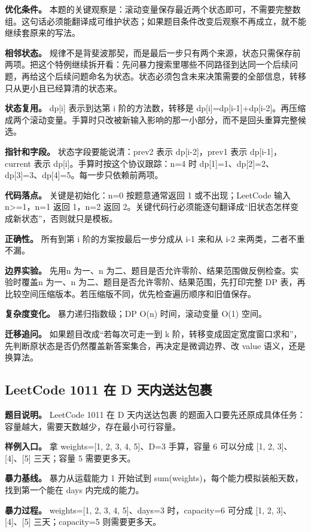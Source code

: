\textbf{优化条件。} 本题的关键观察是：滚动变量保存最近两个状态即可，不需要完整数组。这句话必须能翻译成可维护状态；如果题目条件改变后观察不再成立，就不能继续套原来的写法。

\textbf{相邻状态。} 规律不是背斐波那契，而是最后一步只有两个来源，状态只需保存前两项。把这个特例继续拆开看：先问暴力搜索里哪些不同路径到达同一个后续问题，再给这个后续问题命名为状态。状态必须包含未来决策需要的全部信息，转移只从更小且已经算清的状态来。

\textbf{状态复用。} dp[i] 表示到达第 i 阶的方法数，转移是 dp[i]=dp[i-1]+dp[i-2]。再压缩成两个滚动变量。手算时只改被新输入影响的那一小部分，而不是回头重算完整候选。

\textbf{指针和字段。} 状态字段要能说清：prev2 表示 dp[i-2]，prev1 表示 dp[i-1]，current 表示 dp[i]。手算时按这个协议跟踪：n=4 时 dp[1]=1、dp[2]=2、dp[3]=3、dp[4]=5。每一步只依赖前两项。

\textbf{代码落点。} 关键是初始化：n=0 按题意通常返回 1 或不出现；LeetCode 输入 n>=1，n=1 返回 1，n=2 返回 2。关键代码行必须能逐句翻译成“旧状态怎样变成新状态”，否则就只是模板。

\textbf{正确性。} 所有到第 i 阶的方案按最后一步分成从 i-1 来和从 i-2 来两类，二者不重不漏。

\textbf{边界实验。} 先用n 为一、n 为二、题目是否允许零阶、结果范围做反例检查。实验时覆盖n 为一、n 为二、题目是否允许零阶、结果范围，先打印完整 DP 表，再比较空间压缩版本。若压缩版不同，优先检查遍历顺序和旧值保存。

\textbf{复杂度变化。} 暴力递归指数级；DP O(n) 时间，滚动变量 O(1) 空间。

\textbf{迁移追问。} 如果题目改成“若每次可走一到 k 阶，转移变成固定宽度窗口求和”，先判断原状态是否仍然覆盖新答案集合，再决定是微调边界、改 value 语义，还是换算法。

\subsection{LeetCode 1011 在 D 天内送达包裹}

\textbf{题目说明。} LeetCode 1011 在 D 天内送达包裹 的题面入口要先还原成具体任务：容量越大，需要天数越少，存在最小可行容量。

\textbf{样例入口。} 拿 weights=[1, 2, 3, 4, 5]、D=3 手算，容量 6 可以分成 [1, 2, 3]、[4]、[5] 三天；容量 5 需要更多天。

\textbf{暴力基线。} 暴力从运载能力 1 开始试到 sum(weights)，每个能力模拟装船天数，找到第一个能在 days 内完成的能力。

\textbf{暴力过程。} weights=[1, 2, 3, 4, 5]、days=3 时，capacity=6 可分成 [1, 2, 3]、[4]、[5] 三天；capacity=5 则需要更多天。

